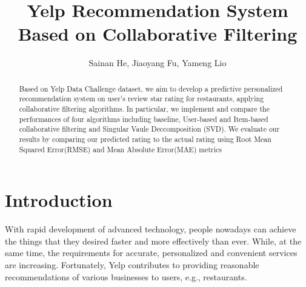 \documentclass{llncs}
\begin{document}
%
\frontmatter          %
%
\pagestyle{headings}  %


%

%
\mainmatter              %
%
\title{Yelp Recommendation System Based on Collaborative Filtering}
%
%
\author{Sainan He, Jiaoyang Fu, Yameng Lio}
%
%
%

\maketitle              %

\begin{abstract}
Based on Yelp Data Challenge dataset, we aim to develop a predictive personalized recommendation system on user’s review star rating for restaurants, applying collaborative filtering algorithms. In particular, we implement and compare the performances of four algorithms including baseline, User-based and Item-based collaborative filtering and Singular Vaule Deccomposition (SVD). We evaluate our results by comparing our predicted rating to the actual rating using Root Mean Squared Error(RMSE) and Mean Absolute Error(MAE) metrics
\end{abstract}
%
\section{Introduction}
%
With rapid development of advanced technology, people nowadays can achieve the things that they desired faster and more effectively than ever. While, at the same time, the requirements for accurate, personalized and convenient services are increasing. Fortunately, Yelp contributes to providing reasonable recommendations of various businesses to users, e.g., restaurants.
\end{document}
